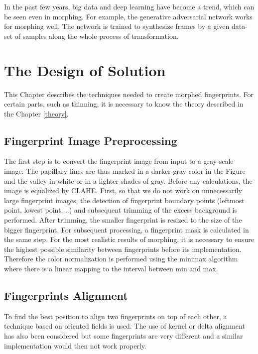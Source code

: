 In the past few years, big data and deep learning have become a trend, which can be seen even in morphing. For example, the generative adversarial network works for morphing well. The network is trained to synthesize frames by a given data-set of samples along the whole process of transformation. \cite{morphing3}


\chapter{The Design of Solution}
\label{suggestion}
This Chapter describes the techniques needed to create morphed fingerprints. For certain parts, such as thinning, it is necessary to know the theory described in the Chapter \ref{theory}.

\section{Fingerprint Image Preprocessing}\label{preprocessing}
The first step is to convert the fingerprint image from input to a gray-scale image. The papillary lines are thus marked in a darker gray color in the Figure and the valley in white or in a lighter shades of gray. Before any calculations, the image is equalized by CLAHE. First, so that we do not work on unnecessarily large fingerprint images, the detection of fingerprint boundary points (leftmost point, lowest point, ..) and subsequent trimming of the excess background is performed. After trimming, the smaller fingerprint is resized to the size of the bigger fingerprint. For subsequent processing, a fingerprint mask is calculated in the same step. For the most realistic results of morphing, it is necessary to ensure the highest possible similarity between fingerprints before its implementation. Therefore the color normalization is performed using the minimax algorithm where there is a linear mapping to the interval between min and max.

\section{Fingerprints Alignment}
To find the best position to align two fingerprints on top of each other, a technique based on oriented fields is used. The use of kernel or delta alignment has also been considered but some fingerprints are very different and a similar implementation would then not work properly.

